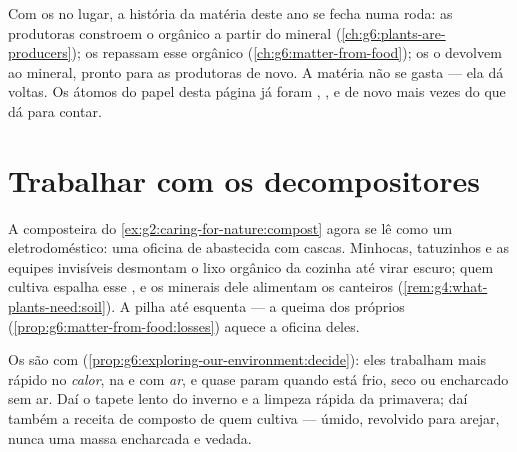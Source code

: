 \begin{remark}\label{rem:g6:decomposers-and-soil:circle}
Com os  no lugar, a história da matéria deste ano se
fecha numa roda: as produtoras constroem o orgânico a partir do
mineral (\cref{ch:g6:plants-are-producers}); os  repassam
esse orgânico (\cref{ch:g6:matter-from-food}); os  o
devolvem ao mineral, pronto para as produtoras de novo. A matéria não
se gasta --- ela dá voltas. Os átomos do papel desta página já foram
, ,  e  de novo mais vezes do que dá para contar.
\end{remark}

\section{Trabalhar com os decompositores}

\begin{example}\label{ex:g6:decomposers-and-soil:compost}
A composteira do \cref{ex:g2:caring-for-nature:compost} agora se lê
como um eletrodoméstico: uma oficina de  abastecida com
cascas. Minhocas, tatuzinhos e as equipes invisíveis desmontam o lixo
orgânico da cozinha até virar  escuro; quem cultiva espalha esse
, e os minerais dele alimentam os canteiros
(\cref{rem:g4:what-plants-need:soil}). A pilha até esquenta --- a
queima dos próprios 
(\cref{prop:g6:matter-from-food:losses}) aquece a oficina deles.
\end{example}

\begin{proposition}\label{prop:g6:decomposers-and-soil:speed}
Os  são  com 
(\cref{prop:g6:exploring-our-environment:decide}): eles trabalham mais
rápido no \emph{calor}, na \emph{} e com \emph{ar}, e quase
param quando está frio, seco ou encharcado sem ar. Daí o tapete lento
do inverno e a limpeza rápida da primavera; daí também a receita de
composto de quem cultiva --- úmido, revolvido para arejar, nunca uma
massa encharcada e vedada.
\end{proposition}
\admitted

